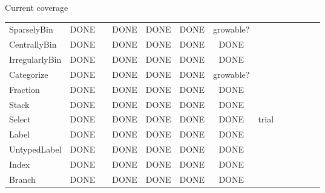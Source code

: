 \documentclass[aspectratio=169]{beamer}
\begin{document}
\begin{frame}{Current coverage}
\begin{tabular}{l c c c c c c c c c c c c}
SparselyBin       & \cellcolor{yellow!50}DONE  &         & \cellcolor{yellow!50}DONE  & \cellcolor{yellow!50}DONE  & \cellcolor{yellow!50}DONE  & growable?                  &                            &                           & & \\
CentrallyBin      & \cellcolor{yellow!50}DONE  &         & \cellcolor{yellow!50}DONE  & \cellcolor{yellow!50}DONE  & \cellcolor{yellow!50}DONE  & \cellcolor{yellow!50}DONE  &                            &                           & & \\
IrregularlyBin    & \cellcolor{yellow!50}DONE  &         & \cellcolor{yellow!50}DONE  & \cellcolor{yellow!50}DONE  & \cellcolor{yellow!50}DONE  & \cellcolor{yellow!50}DONE  &                            &                           & & \\
Categorize        & \cellcolor{yellow!50}DONE  &         & \cellcolor{yellow!50}DONE  & \cellcolor{yellow!50}DONE  & \cellcolor{yellow!50}DONE  & growable?                  &                            &                           & & \\
Fraction          & \cellcolor{yellow!50}DONE  &         & \cellcolor{yellow!50}DONE  & \cellcolor{yellow!50}DONE  & \cellcolor{yellow!50}DONE  & \cellcolor{yellow!50}DONE  &                            &                           & & \\
Stack             & \cellcolor{yellow!50}DONE  &         & \cellcolor{yellow!50}DONE  & \cellcolor{yellow!50}DONE  & \cellcolor{yellow!50}DONE  & \cellcolor{yellow!50}DONE  &                            &                           & & \\
Select            & \cellcolor{yellow!50}DONE  &         & \cellcolor{yellow!50}DONE  & \cellcolor{yellow!50}DONE  & \cellcolor{yellow!50}DONE  & \cellcolor{yellow!50}DONE  & \cellcolor{red!25}trial    &                           & & \\\hline
Label             & \cellcolor{yellow!50}DONE  &         & \cellcolor{yellow!50}DONE  & \cellcolor{yellow!50}DONE  & \cellcolor{yellow!50}DONE  & \cellcolor{yellow!50}DONE  &                            &                           & & \\
UntypedLabel      & \cellcolor{yellow!50}DONE  &         & \cellcolor{yellow!50}DONE  & \cellcolor{yellow!50}DONE  & \cellcolor{yellow!50}DONE  & \cellcolor{yellow!50}DONE  &                            &                           & & \\
Index             & \cellcolor{yellow!50}DONE  &         & \cellcolor{yellow!50}DONE  & \cellcolor{yellow!50}DONE  & \cellcolor{yellow!50}DONE  & \cellcolor{yellow!50}DONE  &                            &                           & & \\
Branch            & \cellcolor{yellow!50}DONE  &         & \cellcolor{yellow!50}DONE  & \cellcolor{yellow!50}DONE  & \cellcolor{yellow!50}DONE  & \cellcolor{yellow!50}DONE  &                            &                           & & \\\hline\hline
\end{tabular}


\end{frame}
\end{document}

